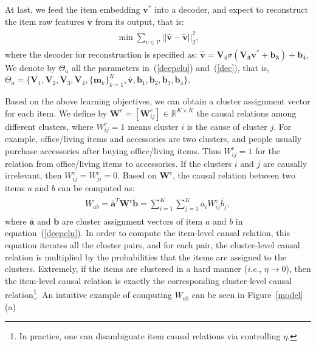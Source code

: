 \documentclass[conference]{IEEEtran}
\theoremstyle{definition}
\theoremstyle{theorem}
\theoremstyle{proof}
\theoremstyle{remark}
\begin{document}
At last, we feed the item embedding $\bm{v}^*$ into a decoder, and expect to reconstruct the item raw features $\tilde{\bm{v}}$ from its output, that is:
	\begin{eqnarray}\label{dec}
		\begin{aligned}
		\min \sum_{v\in \mathcal{V}}||\hat{\bm{v}}-\tilde{\bm{v}}||^2_2,
		\end{aligned}
	\end{eqnarray}
where the decoder for reconstruction is specified as: $\hat{\bm{v}} = \bm{V}_4\sigma(\bm{\bm{V}_3\bm{v}^*+\bm{b}_3})+\bm{b}_4$,
We denote by $\Theta_{a}$ all the parameters in~(\ref{deepclu}) and~(\ref{dec}), that is, $\Theta_{a} = \{\bm{V}_1,\bm{V}_2,\bm{V}_3,\bm{V}_4,\{\bm{m}_k\}_{k=1}^K,\overline{\bm{v}},\bm{b}_1,\bm{b}_2,\bm{b}_3,\bm{b}_4\}$.


Based on the above learning objectives, we can obtain a cluster assignment vector for each item.
We define by $\bm{W}^c=[\bm{W}^c_{ij}]\in \mathbb{R}^{K\times K}$ the causal relations among different clusters, where ${W}^c_{ij}=1$ means cluster $i$ is the cause of cluster $j$.
For example, office/living items and accessories are two clusters, and people usually purchase accessories after buying office/living items.
Thus $W^c_{ij}=1$ for the relation from office/living items to accessories.
If the clusters $i$ and $j$ are causally irrelevant, then $W^c_{ij}=W^c_{ji}=0$.
Based on $\bm{W}^c$, the causal relation between two items $a$ and $b$ can be computed as:
{\setlength\abovedisplayskip{2pt}
	\setlength\belowdisplayskip{2pt}
	\begin{eqnarray}\label{st}
		\begin{aligned}
			W_{ab} = \overline{\bm{a}}^T\bm{W}^c\overline{\bm{b}} = \sum_{i=1}^K\sum_{j=1}^K \overline{{a}}_i W^c_{ij} \overline{{b}}_j,
		\end{aligned}
	\end{eqnarray}
}
where $\overline{\bm{a}}$ and $\overline{\bm{b}}$ are cluster assignment vectors of item $a$ and $b$ in equation~(\ref{deepclu}).
In order to compute the item-level causal relation, this equation iterates all the cluster pairs, and for each pair, the cluster-level causal relation is multiplied by the probabilities that the items are assigned to the clusters.
Extremely, if the items are clustered in a hard manner (\emph{i.e.}, $\eta\rightarrow 0$), then the item-level causal relation is exactly the corresponding cluster-level causal relation\footnote{In practice, one can disambiguate item causal relations via controlling $\eta$.}. 
An intuitive example of computing $W_{ab}$ can be seen in Figure~\ref{model}(a)
\end{document}
